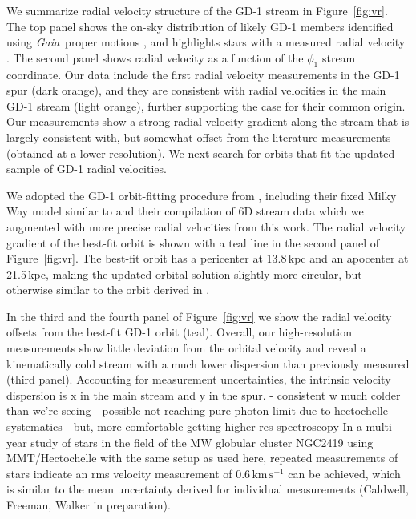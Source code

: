 \documentclass[twocolumn]{aastex63}
\newcommand{\gaia}{\textsl{Gaia}}
\newcommand{\kms}{\ensuremath{\textrm{km}\,\textrm{s}^{-1}}}
\begin{document}
We summarize radial velocity structure of the GD-1 stream in Figure~\ref{fig:vr}.
The top panel shows the on-sky distribution of likely GD-1 members identified using \gaia\ proper motions \citep[small points,][]{pwb}, and highlights stars with a measured radial velocity \citep[orange for this work, gray for literature data from][]{koposov2010}.
The second panel shows radial velocity as a function of the $\phi_1$ stream coordinate.
Our data include the first radial velocity measurements in the GD-1 spur (dark orange), and they are consistent with radial velocities in the main GD-1 stream (light orange), further supporting the case for their common origin.
Our measurements show a strong radial velocity gradient along the stream that is largely consistent with, but somewhat offset from the literature measurements (obtained at a lower-resolution).
We next search for orbits that fit the updated sample of GD-1 radial velocities.

We adopted the GD-1 orbit-fitting procedure from \citet{pwb}, including their fixed Milky Way model similar to \citet{bovy2015} and their compilation of 6D stream data which we augmented with more precise radial velocities from this work.
The radial velocity gradient of the best-fit orbit is shown with a teal line in the second panel of Figure~\ref{fig:vr}.
The best-fit orbit has a pericenter at 13.8\,kpc and an apocenter at 21.5\,kpc, making the updated orbital solution slightly more circular, but otherwise similar to the orbit derived in \citet{pwb}.

In the third and the fourth panel of Figure~\ref{fig:vr} we show the radial velocity offsets from the best-fit GD-1 orbit (teal).
Overall, our high-resolution measurements show little deviation from the orbital velocity and reveal a kinematically cold stream with a much lower dispersion than previously measured (third panel).
Accounting for measurement uncertainties, the intrinsic velocity dispersion is x in the main stream and y in the spur.
- consistent w much colder than we're seeing
- possible not reaching pure photon limit due to hectochelle systematics
- but, more comfortable getting higher-res spectroscopy
In a multi-year study of stars in the field of the MW globular cluster NGC2419 using MMT/Hectochelle with the same setup as used here, repeated measurements of stars indicate an rms velocity measurement of $0.6\,\kms$ can be achieved, which is similar to the mean uncertainty derived for individual measurements (Caldwell, Freeman, Walker in preparation).
\end{document}
